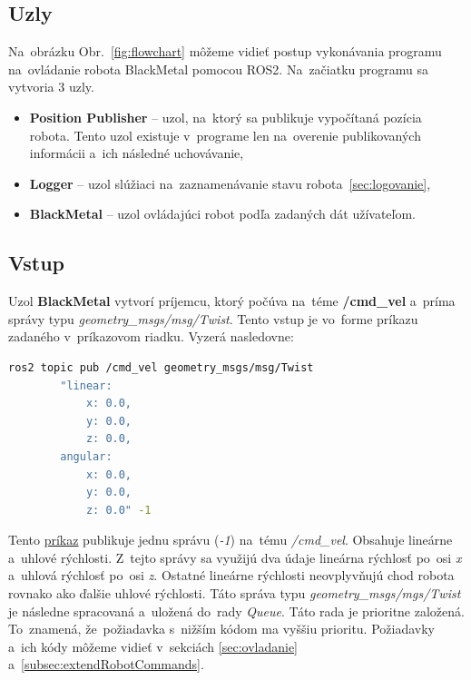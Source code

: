 \subsection{Uzly}
\label{subsec:nodes}

Na~obrázku Obr.~\ref{fig:flowchart} môžeme vidieť postup vykonávania programu na~ovládanie
robota BlackMetal pomocou ROS2. Na~začiatku programu sa vytvoria 3 uzly.

\begin{itemize}
	\item \textbf{Position Publisher} -- uzol, na~ktorý sa publikuje vypočítaná pozícia robota.
		Tento uzol existuje v~programe len na~overenie publikovaných informácii a~ich následné uchovávanie,
	\item \textbf{Logger} -- uzol slúžiaci na~zaznamenávanie stavu robota~\ref{sec:logovanie},
	\item \textbf{BlackMetal} --  uzol ovládajúci robot podľa zadaných dát užívateľom.
\end{itemize}

\subsection{Vstup}
\label{subsec:input}

Uzol \textbf{BlackMetal} vytvorí príjemcu, ktorý počúva na~téme \textbf{/cmd\_vel} a~príma správy typu
\textit{geometry\_msgs/msg/Twist}. Tento vstup je vo~forme príkazu zadaného v~príkazovom riadku. Vyzerá nasledovne:


\label{requestCommand}
\begin{lstlisting}[language=bash]
	ros2 topic pub /cmd_vel geometry_msgs/msg/Twist
		"linear:
			x: 0.0,
			y: 0.0,
			z: 0.0,
		angular:
			x: 0.0,
			y: 0.0,
			z: 0.0" -1
\end{lstlisting}

Tento \hyperref[requestCommand]{príkaz} publikuje jednu správu (\textit{-1}) na~tému \textit{/cmd\_vel}.
Obsahuje lineárne a~uhlové rýchlosti. Z~tejto správy sa využijú dva údaje lineárna rýchlosť
po~osi \textit{x} a~uhlová rýchlosť po~osi \textit{z}. Ostatné lineárne rýchlosti neovplyvňujú
chod robota rovnako ako ďalšie uhlové rýchlosti. Táto správa typu \textit{geometry\_msgs/mgs/Twist}
je následne spracovaná a~uložená do~rady \textit{Queue}. Táto rada je prioritne založená.
To~znamená, že~požiadavka s~nižším kódom ma vyššiu prioritu. Požiadavky a~ich kódy môžeme vidieť v~sekciách \ref{sec:ovladanie} a~\ref{subsec:extendRobotCommands}.

